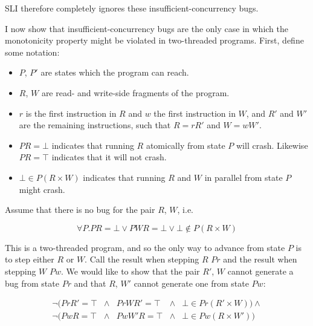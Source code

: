 SLI therefore completely ignores these insufficient-concurrency
bugs.

I now show that insufficient-concurrency bugs are the only case in
which the monotonicity property might be violated in two-threaded
programs.
First, define some notation:

\begin{itemize}
\item $P$, $P'$ are states which the program can reach.
\item $R$, $W$ are read- and write-side fragments of the program.
\item $r$ is the first instruction in $R$ and $w$ the first
  instruction in $W$, and $R'$ and $W'$ are the remaining
  instructions, such that $R = rR'$ and $W = wW'$.
\item $PR = \bot$ indicates that running $R$ atomically from state $P$
  will crash.  Likewise $PR = \top$ indicates that it will not crash.
\item $\bot \in P(R \times W)$ indicates that running $R$ and $W$ in
  parallel from state $P$ might crash.
\end{itemize}

Assume that there is no bug for the pair $R$, $W$, i.e.

\begin{displaymath}
  {\forall}P.PR = \bot \vee PWR = \bot \vee \bot \not\in P(R \times W)
\end{displaymath}

This is a two-threaded program, and so the only way to advance from
state $P$ is to step either $R$ or $W$.  Call the result when stepping
$R$ $Pr$ and the result when stepping $W$ $Pw$.  We would like to show
that the pair $R'$, $W$ cannot generate a bug from state $Pr$ and that
$R$, $W'$ cannot generate one from state $Pw$:

\begin{displaymath}
\begin{array}{lllll}
  {\neg}(PrR' = \top & \wedge & PrWR'  = \top & \wedge & \bot \in Pr(R' \times W)) \wedge \\
  {\neg}(PwR  = \top & \wedge & PwW'R = \top  & \wedge & \bot \in Pw(R  \times W'))
\end{array}
\end{displaymath}

